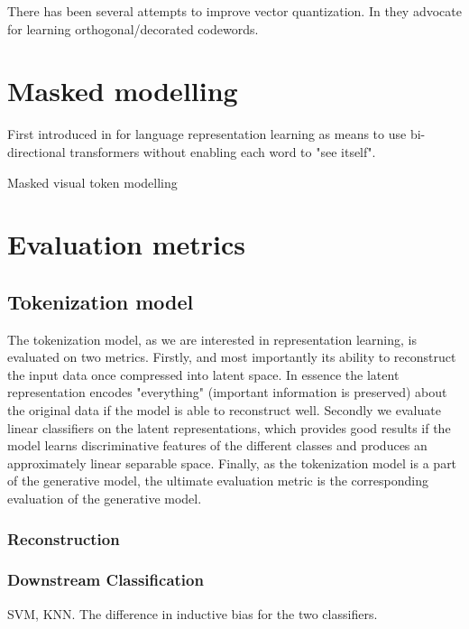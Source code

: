 \documentclass[../../thesis.tex]{subfiles}
\begin{document}
There has been several attempts to improve vector quantization. In \cite{shin2023exploration} they advocate for learning orthogonal/decorated codewords. 

\section{Masked modelling}
First introduced in \cite{devlin2019bert} for language representation learning as means to use bi-directional transformers without enabling each word to "see itself". \newline

Masked visual token modelling \cite{chang2022maskgit}



\section{Evaluation metrics}

\subsection{Tokenization model}

The tokenization model, as we are interested in representation learning, is evaluated on two metrics. Firstly, and most importantly its ability to reconstruct the input data once compressed into latent space. In essence the latent representation encodes "everything" (important information is preserved) about the original data if the model is able to reconstruct well. Secondly we evaluate linear classifiers on the latent representations, which provides good results if the model learns discriminative features of the different classes and produces an approximately linear separable space. Finally, as the tokenization model is a part of the generative model, the ultimate evaluation metric is the corresponding evaluation of the generative model. 

\subsubsection{Reconstruction}


\subsubsection{Downstream Classification}

SVM, KNN. The difference in inductive bias for the two classifiers. 
\end{document}
